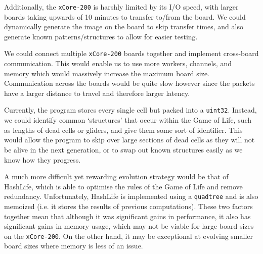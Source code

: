 \documentclass{article}
\begin{document}
    Additionally, the \verb|xCore-200| is harshly limited by its I/O speed, with larger boards taking upwards of 10 minutes to transfer to/from the board. We could dynamically generate the image on the board to skip transfer times, and also generate known patterns/structures to allow for easier testing.

    We could connect multiple \verb|xCore-200| boards together and implement cross-board communication. This would enable us to use more workers, channels, and memory which would massively increase the maximum board size. Communication across the boards would be quite slow however since the packets have a larger distance to travel and therefore larger latency.

    Currently, the program stores every single cell but packed into a \verb|uint32|. Instead, we could identify common `structures' that occur within the Game of Life, such as lengths of dead cells or gliders, and give them some sort of identifier. This would allow the program to skip over large sections of dead cells as they will not be alive in the next generation, or to swap out known structures easily as we know how they progress. 
    
    A much more difficult yet rewarding evolution strategy would be that of HashLife, which is able to optimise the rules of the Game of Life and remove redundancy. Unfortunately, HashLife is implemented using a \verb|quadtree| and is also memoized (i.e. it stores the results of previous computations). These two factors together mean that although it was significant gains in performance, it also has significant gains in memory usage, which may not be viable for large board sizes on the \verb|xCore-200|. On the other hand, it may be exceptional at evolving smaller board sizes where memory is less of an issue.
\end{document}
